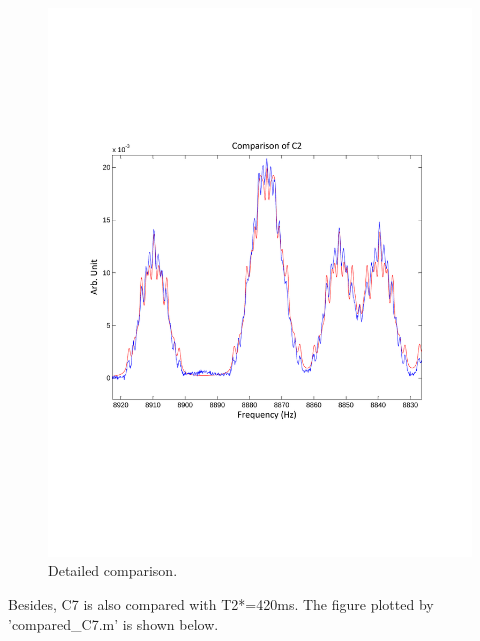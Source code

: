\documentclass[prl,onecolumn]{revtex4-1}
\begin{document}
\begin{figure}
\begin{minipage}[hbtp]{0.5\linewidth}
\includegraphics[width=0.8\columnwidth]{comparison_C2_zoomin.pdf}
\caption{Detailed comparison.}
\label{fig:side:b}
\end{minipage}
\end{figure}

Besides, C7 is also compared with T2*=420ms. The figure plotted by 'compared\_C7.m' is shown below.
\end{document}
